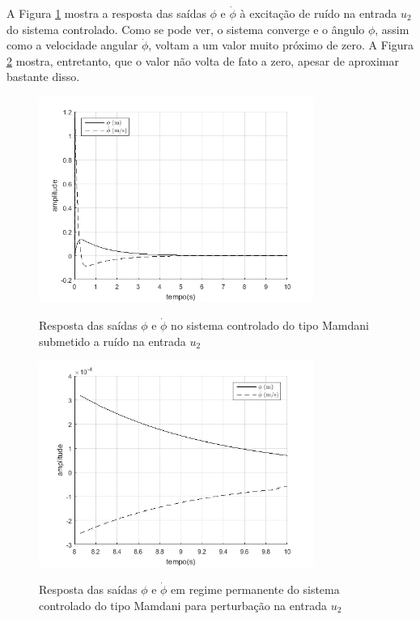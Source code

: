 A Figura \ref{fig:u2_mamdani_u2_phi} mostra a resposta das saídas $\phi$ e $\dot{\phi}$ à excitação de ruído na entrada $u_2$ do sistema controlado. Como se pode ver, o sistema converge e o ângulo $\phi$, assim como a velocidade angular $\dot{\phi}$, voltam a um valor muito próximo de zero. A Figura \ref{fig:u2_mamdani_u2_phi_regime_permanente} mostra, entretanto, que o valor não volta de fato a zero, apesar de aproximar bastante disso.

\begin{figure}[!htb]
    \centering
    \caption{Resposta das saídas $\phi$ e $\dot{\phi}$ no sistema controlado do tipo Mamdani submetido a ruído na entrada $u_2$}
    \includegraphics[width=0.8\textwidth]{./04-figuras/resultados/fis_u2/u2_mamdani_u2_phi}
    \label{fig:u2_mamdani_u2_phi}
\end{figure}

\begin{figure}[!htb]
    \centering
    \caption{Resposta das saídas $\phi$ e $\dot{\phi}$ em regime permanente do sistema controlado do tipo Mamdani para perturbação na entrada $u_2$}
    \includegraphics[width=0.8\textwidth]{./04-figuras/resultados/fis_u2/u2_mamdani_u2_phi_regime_permanente}
    \label{fig:u2_mamdani_u2_phi_regime_permanente}
\end{figure}

